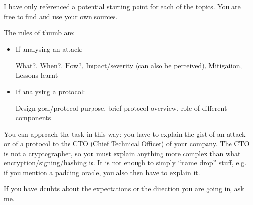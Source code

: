 \documentclass[usegeometry,parskip=half]{scrartcl}
\begin{document}
I have only referenced a potential starting point for each of the topics.
You are free to find and use your own sources.

The rules of thumb are:
\begin{itemize}
  \item If analysing an attack:
  
  What?, When?, How?, Impact/severity (can also be perceived), Mitigation, Lessons learnt

  \item If analysing a protocol:
  
  Design goal/protocol purpose, brief protocol overview, role of different components
\end{itemize}

You can approach the task in this way: you have to explain the gist of an attack or of a protocol to the CTO (Chief Technical Officer) of your company.
The CTO is not a cryptographer, so you must explain anything more complex than what encryption/signing/hashing is.
It is not enough to simply \enquote{name drop} stuff, e.g. if you mention a padding oracle, you also then have to explain it.

If you have doubts about the expectations or the direction you are going in, ask me.

\newpage
\end{document}
